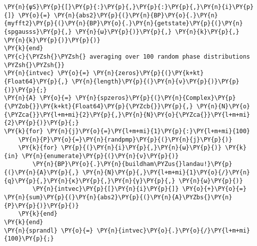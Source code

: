\begin{Verbatim}[commandchars=\\\{\}]
    \PY{n}{ψS}\PY{p}{[}\PY{p}{:}\PY{p}{,}\PY{p}{:}\PY{p}{,}\PY{n}{i}\PY{p}{]} \PY{o}{=} \PY{n}{abs2}\PY{p}{(}\PY{n}{BP}\PY{o}{.}\PY{n}{myfft2}\PY{p}{(}\PY{n}{BP}\PY{o}{.}\PY{n}{getstate}\PY{p}{(}\PY{n}{spgausss}\PY{p}{,} \PY{n}{ω}\PY{p}{)}\PY{p}{,} \PY{n}{k}\PY{p}{,} \PY{n}{k}\PY{p}{)}\PY{p}{)}
\PY{k}{end}
\PY{c}{\PYZsh{}\PYZsh{} averaging over 100 random phase distributions \PYZsh{}\PYZsh{}}
\PY{n}{intvec} \PY{o}{=} \PY{n}{zeros}\PY{p}{(}\PY{k+kt}{Float64}\PY{p}{,} \PY{n}{length}\PY{p}{(}\PY{n}{ν}\PY{p}{)}\PY{p}{)}\PY{p}{;}
\PY{n}{A} \PY{o}{=} \PY{n}{spzeros}\PY{p}{(}\PY{n}{Complex}\PY{p}{\PYZob{}}\PY{k+kt}{Float64}\PY{p}{\PYZcb{}}\PY{p}{,} \PY{n}{N}\PY{o}{\PYZca{}}\PY{l+m+mi}{2}\PY{p}{,}\PY{n}{N}\PY{o}{\PYZca{}}\PY{l+m+mi}{2}\PY{p}{)}\PY{p}{;}
\PY{k}{for} \PY{n}{j}\PY{o}{=}\PY{l+m+mi}{1}\PY{p}{:}\PY{l+m+mi}{100}
    \PY{n}{P}\PY{o}{=}\PY{n}{randpmp}\PY{p}{(}\PY{n}{j}\PY{p}{)}
    \PY{k}{for} \PY{p}{(}\PY{n}{i}\PY{p}{,}\PY{n}{ω}\PY{p}{)} \PY{k}{in} \PY{n}{enumerate}\PY{p}{(}\PY{n}{ν}\PY{p}{)}
        \PY{n}{BP}\PY{o}{.}\PY{n}{buildham\PYZus{}landau!}\PY{p}{(}\PY{n}{A}\PY{p}{,} \PY{n}{N}\PY{p}{,}\PY{l+m+mi}{1}\PY{o}{/}\PY{n}{q}\PY{p}{,}\PY{n}{κ}\PY{p}{,}\PY{n}{γ}\PY{p}{,} \PY{n}{ω}\PY{p}{)}
        \PY{n}{intvec}\PY{p}{[}\PY{n}{i}\PY{p}{]} \PY{o}{+}\PY{o}{=} \PY{n}{sum}\PY{p}{(}\PY{n}{abs2}\PY{p}{(}\PY{n}{A}\PYZbs{}\PY{n}{P}\PY{p}{)}\PY{p}{)}
    \PY{k}{end}
\PY{k}{end}
\PY{n}{sprandl} \PY{o}{=} \PY{n}{intvec}\PY{o}{.}\PY{o}{/}\PY{l+m+mi}{100}\PY{p}{;}


\end{Verbatim}
